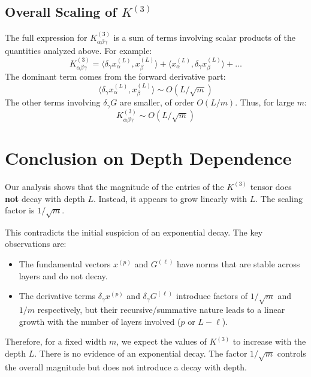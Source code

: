 \documentclass[11pt,a4paper]{article}
\begin{document}
\subsection{Overall Scaling of $K^{(3)}$}

The full expression for $K^{(3)}_{\alpha\beta\gamma}$ is a sum of terms involving scalar products of the quantities analyzed above. For example:
\begin{equation}
K^{(3)}_{\alpha\beta\gamma} = \langle \delta_\gamma x^{(L)}_\alpha, x^{(L)}_\beta \rangle + \langle x^{(L)}_\alpha, \delta_\gamma x^{(L)}_\beta \rangle + \dots
\end{equation}
The dominant term comes from the forward derivative part:
\begin{equation}
    \langle \delta_\gamma x^{(L)}_\alpha, x^{(L)}_\beta \rangle \sim O(L/\sqrt{m})
\end{equation}
The other terms involving $\delta_\gamma G$ are smaller, of order $O(L/m)$. Thus, for large $m$:
\begin{equation}
    K^{(3)}_{\alpha\beta\gamma} \sim O(L/\sqrt{m})
\end{equation}

\section{Conclusion on Depth Dependence}

Our analysis shows that the magnitude of the entries of the $K^{(3)}$ tensor does \textbf{not} decay with depth $L$. Instead, it appears to grow linearly with $L$. The scaling factor is $1/\sqrt{m}$.

This contradicts the initial suspicion of an exponential decay. The key observations are:
\begin{itemize}
    \item The fundamental vectors $x^{(p)}$ and $G^{(\ell)}$ have norms that are stable across layers and do not decay.
    \item The derivative terms $\delta_\gamma x^{(p)}$ and $\delta_\gamma G^{(\ell)}$ introduce factors of $1/\sqrt{m}$ and $1/m$ respectively, but their recursive/summative nature leads to a linear growth with the number of layers involved ($p$ or $L-\ell$).
\end{itemize}

Therefore, for a fixed width $m$, we expect the values of $K^{(3)}$ to increase with the depth $L$. There is no evidence of an exponential decay. The factor $1/\sqrt{m}$ controls the overall magnitude but does not introduce a decay with depth.
\end{document}
